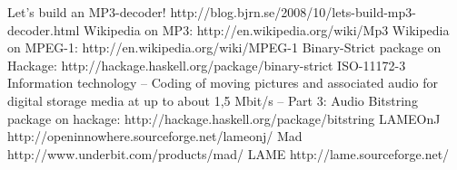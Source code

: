 \documentclass[a4paper,12pt]{article}
\begin{document}
\begin{thebibliography}{99}
        Let's build an MP3-decoder!
        http://blog.bjrn.se/2008/10/lets-build-mp3-decoder.html
        Wikipedia on MP3: http://en.wikipedia.org/wiki/Mp3
        Wikipedia on MPEG-1: http://en.wikipedia.org/wiki/MPEG-1
        Binary-Strict package on Hackage:
        http://hackage.haskell.org/package/binary-strict
        ISO-11172-3 Information technology -- Coding of moving pictures and
        associated audio for digital storage media at up to about 1,5 Mbit/s --
        Part 3: Audio
        Bitstring package on hackage:
        http://hackage.haskell.org/package/bitstring
       LAMEOnJ
       http://openinnowhere.sourceforge.net/lameonj/
       Mad
       http://www.underbit.com/products/mad/
       LAME
       http://lame.sourceforge.net/
\end{thebibliography}
\end{document}

